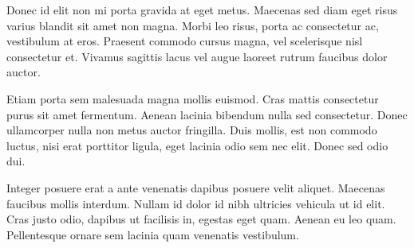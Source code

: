Donec id elit non mi porta gravida at eget metus. Maecenas sed diam eget risus varius blandit sit amet non magna. Morbi leo risus, porta ac consectetur ac, vestibulum at eros. Praesent commodo cursus magna, vel scelerisque nisl consectetur et. Vivamus sagittis lacus vel augue laoreet rutrum faucibus dolor auctor.

Etiam porta sem malesuada magna mollis euismod. Cras mattis consectetur purus sit amet fermentum. Aenean lacinia bibendum nulla sed consectetur. Donec ullamcorper nulla non metus auctor fringilla. Duis mollis, est non commodo luctus, nisi erat porttitor ligula, eget lacinia odio sem nec elit. Donec sed odio dui.

Integer posuere erat a ante venenatis dapibus posuere velit aliquet. Maecenas faucibus mollis interdum. Nullam id dolor id nibh ultricies vehicula ut id elit. Cras justo odio, dapibus ut facilisis in, egestas eget quam. Aenean eu leo quam. Pellentesque ornare sem lacinia quam venenatis vestibulum.

\chapterreturn
